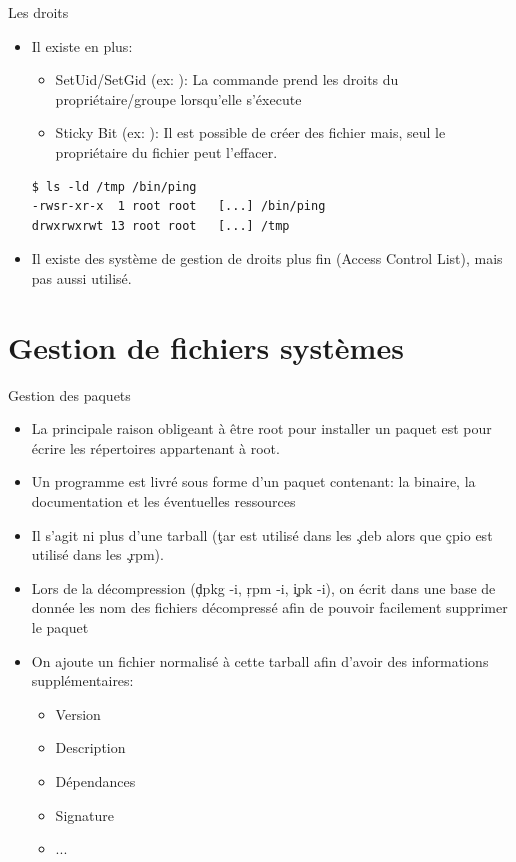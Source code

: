 \begin{frame}[fragile=singleslide]{Les droits}
  \begin{itemize}
  \item Il existe en plus:
    \begin{itemize}
    \item SetUid/SetGid (ex: ): La commande prend les droits
      du propriétaire/groupe lorsqu'elle s'éxecute
    \item Sticky Bit  (ex: ): Il est possible  de créer des
      fichier mais, seul le propriétaire du fichier peut l'effacer.
    \end{itemize}
    \begin{lstlisting}[columns=fixed]
$ ls -ld /tmp /bin/ping
-rwsr-xr-x  1 root root   [...] /bin/ping
drwxrwxrwt 13 root root   [...] /tmp
    \end{lstlisting}
  \item Il  existe des système de  gestion de droits  plus fin (Access
    Control List), mais pas aussi utilisé.
  \end{itemize}
\end{frame}

\section{Gestion de fichiers systèmes}

\begin{frame}[fragile=singleslide]{Gestion des paquets}
  \begin{itemize}
  \item La principale  raison obligeant à être root  pour installer un
    paquet est pour écrire les répertoires appartenant à root.
  \item Un  programme est livré  sous forme d'un paquet  contenant: la
    binaire, la documentation et les éventuelles ressources
  \item Il s'agit ni plus  d'une tarball (\c{tar} est utilisé dans les
    \c{.deb} alors que \c{cpio} est utilisé dans les \c{.rpm}).
  \item  Lors de  la décompression  (\c{dpkg -i},  \c{rpm  -i}, \c{ipk
      -i}),  on écrit dans  une base  de donnée  les nom  des fichiers
    décompressé afin de pouvoir facilement supprimer le paquet
  \item On  ajoute un fichier  normalisé à cette tarball  afin d'avoir
    des informations supplémentaires:
    \begin{itemize}
    \item Version
    \item Description
    \item Dépendances
    \item Signature
    \item ...
    \end{itemize}
  \end{itemize}
\end{frame}

